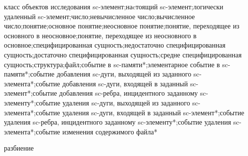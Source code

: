 \begin{SCn}
\begin{scnsubstruct}
\begin{scnhaselementrolelist}{класс объектов исследования}
sc-элемент;наcтоящий sc-элемент;логически удаленный sc-элемент;число;невычисленное число;вычисленное число;понятие;основное понятие;неосновное понятие;понятие, переходящее из основного в неосновное;понятие, переходящее из неосновного в основное;специфицированная сущность;недостаточно специфицированная сущность;достаточно специфицированная сущность;средне специфицированная сущность;структура;файл;событие в sc-памяти*;элементарное событие в sc-памяти*;событие добавления sc-дуги, выходящей из заданного sc-элемента*;событие добавления sc-дуги, входящей в заданный sc-элемент*;событие добавления sc-ребра, инцидентного заданному sc-элементу*;событие удаления sc-дуги, выходящей из заданного sc-элемента*;событие удаления sc-дуги, входящей в заданный sc-элемент*;событие удаления sc-ребра, инцидентного заданному sc-элементу*;событие удаления sc-элемента*;событие изменения содержимого файла*

\end{scnhaselementrolelist}
\begin{scnreltoset}{разбиение}


\end{scnreltoset}
\begin{scnsubdividing}


\end{scnsubdividing}
\begin{scnsubdividing}



\end{scnsubdividing}
\end{scnsubstruct}
\end{SCn}

